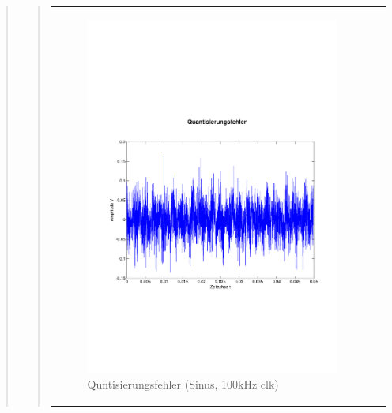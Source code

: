 \begin{quote}
\begin{quote}
\begin{center}
\begin{tabular}{ll}
            \hspace{-4cm}
                
                \begin{minipage}{0.55\textwidth}
                    \begin{figure}[H]
                        \includegraphics[scale=0.55, trim = 3cm 9cm 1.6cm
                        8.5cm, clip]
                        {./Bilder/sin100_Quantisierungsfehler}
                          \caption{Quntisierungsfehler (Sinus, 100kHz clk)}
                    \end{figure}
                \end{minipage}
                              

\end{tabular}
\end{center}
\end{quote}
\end{quote}
